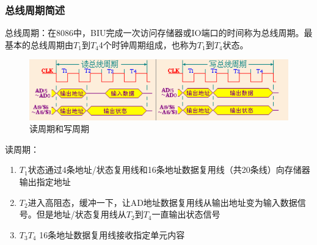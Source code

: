 \subsubsection{总线周期简述}
总线周期：在8086中，BIU完成一次访问存储器或IO端口的时间称为总线周期。最基本的总线周期由$T_1$到$T_4$4个时钟周期组成，也称为$T_1$到$T_4$状态。
\begin{figure}[H]
    \centering
    \includegraphics[scale=1]{part_8086CPU/part_8086CPU_pic/读周期和写周期.png}
    \caption{读周期和写周期}
\end{figure}
读周期：
\begin{enumerate}
    \item $T_1$状态通过4条地址/状态复用线和16条地址数据复用线（共20条线）向存储器输出指定地址
    \item $T_2$进入高阻态，缓冲一下，让AD地址数据复用线从输出地址变为输入数据信号。但是地址/状态复用线从$T_2$到$T_4$一直输出状态信号
    \item $T_3T_4$ 16条地址数据复用线接收指定单元内容
\end{enumerate}
